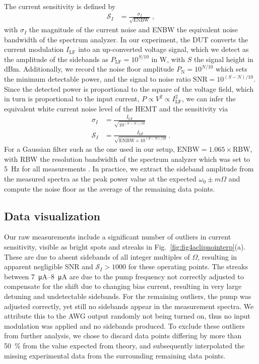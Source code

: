 % 
The current sensitivity is defined by
% 
\begin{align}
\mathcal{S}_I & = \frac{\sigma_I}{\sqrt{\text{ENBW}}}\ ,
\end{align}
% 
with $\sigma_I$ the magnitude of the current noise and ENBW the equivalent noise bandwidth of the spectrum analyzer.
% 
In our experiment, the DUT converts the current modulation $I_\text{LF}$ into an up-converted voltage signal, which we detect as the amplitude of the sidebands as $P_\text{LF}=10^{S/10}$ in \si{\watt}, with $S$ the signal height in \si{dBm}.
% 
Additionally, we record the noise floor amplitude $P_\text{N}=10^{N/10}$ which sets the minimum detectable power, and the signal to noise ratio $\text{SNR}=10^{(S-N)/10}$.
% 
Since the detected power is proportional to the square of the voltage field, which in turn is proportional to the input current, $P \propto V^2 \propto I_\text{LF}^2$, we can infer the equivalent white current noise level of the HEMT and the sensitivity via
% 
\begin{align}
\sigma_I &= \frac{I_\text{LF}}{\sqrt{10^{(S-N)/10}}} \\
\mathcal{S}_I &= \frac{I_\text{LF}}{\sqrt{\text{ENBW}\times10^{(S-N)/10}}}\ .
\end{align}
% 
For a Gaussian filter such as the one used in our setup, $\text{ENBW}=1.065 \times \text{RBW}$, with RBW the resolution bandwidth of the spectrum analyzer which was set to \SI{5}{\hertz} for all measurements \cite{rauscherFundamentalsSpectrumAnalysis2016}.
% 
In practice, we extract the sideband amplitude from the measured spectra as the peak power value at the expected $\omega_0 \pm m\Omega$ and compute the noise floor as the average of the remaining data points.

\subsection{Data visualization}

Our raw measurements include a significant number of outliers in current sensitivity, visible as bright spots and streaks in Fig.~\ref{fig:fig4aclipnointerp}(a).
% 
These are due to absent sidebands of all integer multiples of $\Omega$, resulting in apparent negligible SNR and $\mathcal{S}_I > 1000$ for these operating points.
% 
The streaks between \SIrange{7}{8}{\micro\ampere} are due to the pump frequency not correctly adjusted to compensate for the shift due to changing bias current, resulting in very large detuning and undetectable sidebands.
% 
For the remaining outliers, the pump was adjusted correctly, yet still no sidebands appear in the measurement spectra.
%
We attribute this to the AWG output randomly not being turned on, thus no input modulation was applied and no sidebands produced.
% 
To exclude these outliers from further analysis, we chose to discard data points differing by more than \SI{50}{\percent} from the value expected from theory, and subsequently interpolated the missing experimental data from the surrounding remaining data points.

